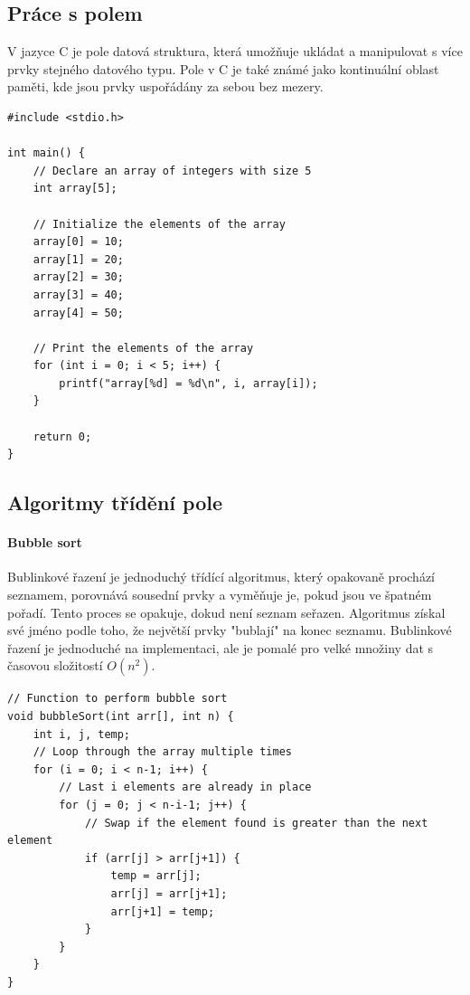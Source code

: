 \subsection{Práce s polem}
V jazyce C je pole datová struktura, která umožňuje ukládat a manipulovat s více prvky stejného datového typu. Pole v C je také známé jako kontinuální oblast paměti, kde jsou prvky uspořádány za sebou bez mezery.
\begin{lstlisting}[style=mystyle]
#include <stdio.h>

int main() {
    // Declare an array of integers with size 5
    int array[5];

    // Initialize the elements of the array
    array[0] = 10;
    array[1] = 20;
    array[2] = 30;
    array[3] = 40;
    array[4] = 50;

    // Print the elements of the array
    for (int i = 0; i < 5; i++) {
        printf("array[%d] = %d\n", i, array[i]);
    }

    return 0;
}
\end{lstlisting}

\subsection{Algoritmy třídění pole}
\paragraph{Bubble sort}
Bublinkové řazení je jednoduchý třídící algoritmus, který opakovaně prochází seznamem, porovnává sousední prvky a vyměňuje je, pokud jsou ve špatném pořadí. Tento proces se opakuje, dokud není seznam seřazen. Algoritmus získal své jméno podle toho, že největší prvky "bublají" na konec seznamu. Bublinkové řazení je jednoduché na implementaci, ale je pomalé pro velké množiny dat s časovou složitostí $O({n^2})$.
\begin{lstlisting}[style=mystyle]
// Function to perform bubble sort
void bubbleSort(int arr[], int n) {
    int i, j, temp;
    // Loop through the array multiple times
    for (i = 0; i < n-1; i++) {
        // Last i elements are already in place
        for (j = 0; j < n-i-1; j++) {
            // Swap if the element found is greater than the next element
            if (arr[j] > arr[j+1]) {
                temp = arr[j];
                arr[j] = arr[j+1];
                arr[j+1] = temp;
            }
        }
    }
}
\end{lstlisting}

